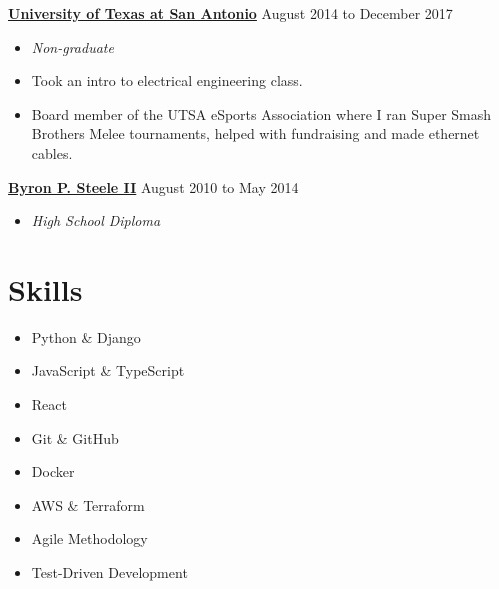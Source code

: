 \documentclass[10pt]{article}
\begin{document}
  \textbf{\href{https://www.utsa.edu/}{University of Texas at San Antonio}} \hfill {August 2014 to December 2017}
   \begin{itemize}
     \item[] \textit{Non-graduate}
     \item[] Took an intro to electrical engineering class.
     \item[] Board member of the UTSA eSports Association where I ran Super Smash Brothers Melee tournaments, helped with fundraising and made ethernet cables.
   \end{itemize}

  \textbf{\href{https://www.scuc.txed.net/ByronSteele}{Byron P. Steele II}} \hfill {August 2010 to May 2014}
   \begin{itemize}
     \item[] \textit{High School Diploma}
   \end{itemize}

  \section*{Skills}

   \begin{multicols}{2}
   \begin{itemize}
        \item[] Python \& Django
        \item[] JavaScript \& TypeScript
        \item[] React
        \item[] Git \& GitHub
        \item[] Docker
        \item[] AWS \& Terraform
        \item[] Agile Methodology
        \item[] Test-Driven Development
   \end{itemize}
   \end{multicols}
\end{document}

